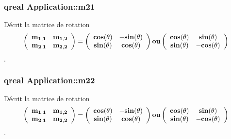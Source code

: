 \subsubsection[{m21}]{\setlength{\rightskip}{0pt plus 5cm}qreal Application\+::m21\hspace{0.3cm}{\ttfamily [protected]}}\label{class_application_a57f2364c5671f6ade315024cff46c975}


Décrit la matrice de rotation \[ \bf \left( \begin{array}{ccc} \bf m_{1,1} & \bf m_{1,2} \\ \bf m_{2,1} & \bf m_{2,2} \\ \end{array} \bf\right) \bf= \bf\left( \begin{array}{ccc} \bf cos(\bf\theta) & \bf -sin(\bf\theta) \\ \bf sin(\bf\theta) & \bf cos(\bf\theta) \\ \end{array} \bf\right) \bf ou \bf\left( \begin{array}{ccc} \bf cos(\bf\theta) & \bf sin(\bf\theta) \\ \bf sin(\bf\theta) & \bf -cos(\bf\theta) \\ \end{array} \bf\right) \]. 

\hypertarget{class_application_aa3e7dad170dc62450e06855fdeea42af}{}
\subsubsection[{m22}]{\setlength{\rightskip}{0pt plus 5cm}qreal Application\+::m22\hspace{0.3cm}{\ttfamily [protected]}}\label{class_application_aa3e7dad170dc62450e06855fdeea42af}


Décrit la matrice de rotation \[ \bf \left( \begin{array}{ccc} \bf m_{1,1} & \bf m_{1,2} \\ \bf m_{2,1} & \bf m_{2,2} \\ \end{array} \bf\right) \bf= \bf\left( \begin{array}{ccc} \bf cos(\bf\theta) & \bf -sin(\bf\theta) \\ \bf sin(\bf\theta) & \bf cos(\bf\theta) \\ \end{array} \bf\right) \bf ou \bf\left( \begin{array}{ccc} \bf cos(\bf\theta) & \bf sin(\bf\theta) \\ \bf sin(\bf\theta) & \bf -cos(\bf\theta) \\ \end{array} \bf\right) \]. 

